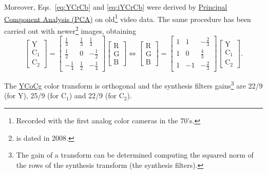 Moreover, Eqs.~\ref{eq:YCrCb} and \ref{eq:iYCrCb} were derived by
\href{https://en.wikipedia.org/wiki/Principal_component_analysis}{Principal
  Component Analysis (PCA)} on old\footnote{Recorded with the first
analog color cameras in the 70's.} video data. The same procedure has
been carried out with newer\footnote{\cite{malvar2008lifting} is dated
in 2008.} images, obtaining
\begin{equation}
  \begin{bmatrix}
    \text{Y} \\
    \text{C}_1 \\
    \text{C}_2
  \end{bmatrix}
  =
  \begin{bmatrix}
    \frac{1}{3} & \frac{1}{3} &  \frac{1}{3} \\ 
    \frac{1}{2} &           0 & -\frac{1}{2} \\
   -\frac{1}{4} & \frac{1}{2} & -\frac{1}{4}
  \end{bmatrix}
  \begin{bmatrix}
    \text{R} \\
    \text{G} \\
    \text{B}
  \end{bmatrix}
  \Leftrightarrow
  \begin{bmatrix}
    \text{R} \\
    \text{G} \\
    \text{B}
  \end{bmatrix}
  =
  \begin{bmatrix}
    1  &  1  & -\frac{2}{3} \\ 
    1  &  0  &  \frac{4}{3} \\ 
    1  & -1  & -\frac{2}{3}
  \end{bmatrix}
  \begin{bmatrix}
    \text{Y} \\
    \text{C}_1 \\
    \text{C}_2
  \end{bmatrix}.
  \label{eq:optimal}
\end{equation}

The \href{https://en.wikipedia.org/wiki/YCoCg}{YCoCg} color transform
is orthogonal and the synthesis filters gains\footnote{The gain of a
transform can be determined computing the squared norm of the rows of
the synthesis transform (the synthesis filters).} are 22/9 (for
$\text{Y}$), 25/9 (for $\text{C}_1$) and 22/9 (for $\text{C}_2$).

